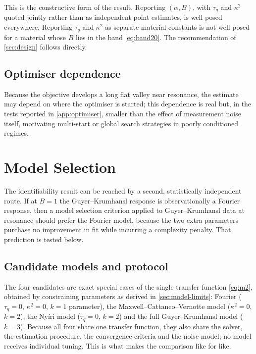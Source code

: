 \documentclass[preprint,12pt,a4paper]{elsarticle}
\theoremstyle{plain}
\theoremstyle{definition}
\theoremstyle{remark}
\newcommand{\tq}{\tau_{q}}
\newcommand{\kk}{\kappa^{2}}
\newcommand{\Bnum}{B}
\begin{document}
This is the constructive form of the result. Reporting $(\alpha, \Bnum)$, with
$\tq$ and $\kk$ quoted jointly rather than as independent point estimates, is
well posed everywhere. Reporting $\tq$ and $\kk$ as separate material constants
is not well posed for a material whose $\Bnum$ lies in the band
\eqref{eq:band20}. The recommendation of \cref{sec:design} follows directly.

\subsection{Optimiser dependence}
\label{sec:prac-optimiser}

Because the objective develops a long flat valley near resonance, the
estimate may depend on where the optimiser is started; this dependence is
real but, in the tests reported in \ref{app:optimiser}, smaller than the
effect of measurement noise itself, motivating multi-start or global search
strategies in poorly conditioned regimes.

\section{Model Selection}
\label{sec:modelselection}

The identifiability result can be reached by a second, statistically
independent route. If at $\Bnum = 1$ the Guyer--Krumhansl response is
observationally a Fourier response, then a model selection criterion applied to
Guyer--Krumhansl data at resonance should prefer the Fourier model, because the
two extra parameters purchase no improvement in fit while incurring a
complexity penalty. That prediction is tested below.

\subsection{Candidate models and protocol}
\label{sec:ms-protocol}

The four candidates are exact special cases of the single transfer function
\eqref{eq:m2}, obtained by constraining parameters as derived in
\cref{sec:model-limits}: Fourier ($\tq=0$, $\kk=0$, $k=1$ parameter), the
Maxwell--Cattaneo--Vernotte model ($\kk = 0$, $k=2$), the Nyíri model
($\tq = 0$, $k=2$) and the full Guyer--Krumhansl model ($k=3$). Because all
four share one transfer function, they also share the solver, the estimation
procedure, the convergence criteria and the noise model; no model receives
individual tuning. This is what makes the comparison like for like.
\end{document}
